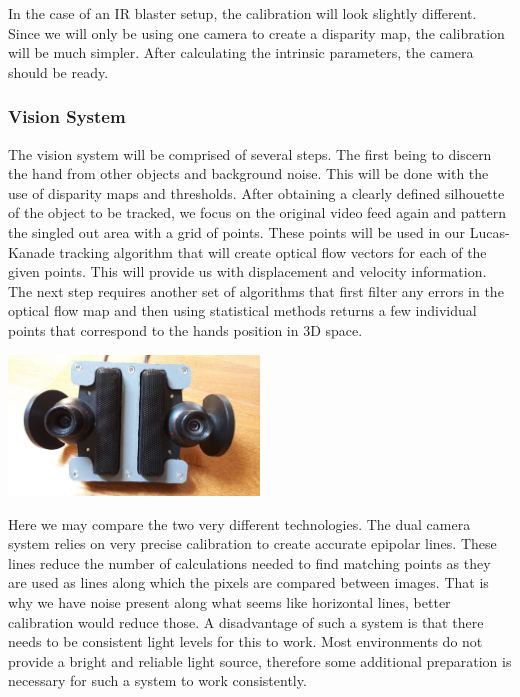 \documentclass{article}
\begin{document}
In the case of an IR blaster setup, the calibration will look slightly different. Since we will only be using one camera to create a disparity map, the calibration will be much simpler. After calculating the intrinsic parameters, the camera should be ready.
\subsubsection{Vision System}
The vision system will be comprised of several steps. The first being to discern the hand from other objects and background noise. This will be done with the use of disparity maps and thresholds. After obtaining a clearly defined silhouette of the object to be tracked, we focus on the original video feed again and pattern the singled out area with a grid of points. These points will be used in our Lucas-Kanade tracking algorithm that will create optical flow vectors for each of the given points. This will provide us with displacement and velocity information. The next step requires another set of algorithms that first filter any errors in the optical flow map and then using statistical methods returns a few individual points that correspond to the hands position in 3D space.


\begin{center}
\includegraphics[width=0.5\textwidth]{IMG/DualCam.jpeg}
\end{center}

\break
Here we may compare the two very different technologies. The dual camera system relies on very precise calibration to create accurate epipolar lines. These lines reduce the number of calculations needed to find matching points as they are used as lines along which the pixels are compared between images. That is why we have noise present along what seems like horizontal lines, better calibration would reduce those. A disadvantage of such a system is that there needs to be consistent light levels for this to work. Most environments do not provide a bright and reliable light source, therefore some additional preparation is necessary for such a system to work consistently.
\end{document}

